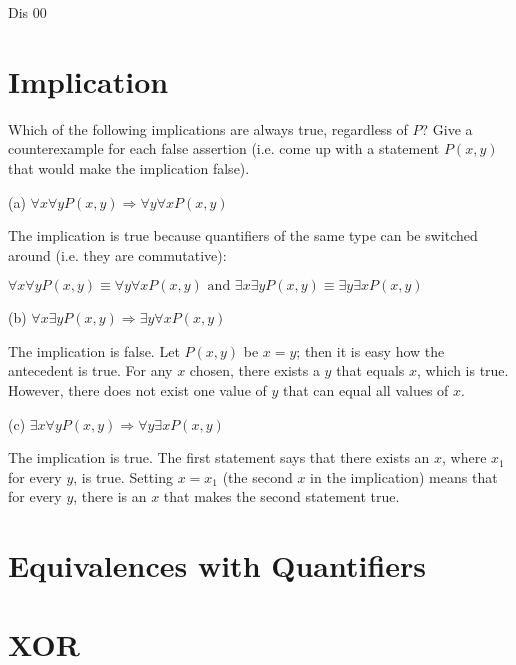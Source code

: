 \documentclass[12pt,a4paper]{article}
\begin{document}
\raggedright

\begin{center}
\huge{Dis 00}
\end{center}

\section{Implication}

Which of the following implications are always true, regardless of $P$? Give a counterexample for each false assertion (i.e. come up with a statement $P(x,y)$ that would make the implication false).

\bigbreak

(a) $\forall x\forall yP(x,y)\Rightarrow\forall y\forall xP(x,y)$

\bigbreak

\color{red}
The implication is true because quantifiers of the same type can be switched around (i.e. they are commutative): 

\begin{center}
$\forall x\forall yP(x,y)\equiv \forall y\forall xP(x,y) \text{ and } \exists x\exists yP(x,y)\equiv \exists y\exists xP(x,y)$
\end{center}

\bigbreak

\color{black}
(b) $\forall x\exists yP(x,y) \Rightarrow \exists y\forall xP(x,y)$

\bigbreak

\color{red}
The implication is false. Let $P(x,y)$ be $x=y$; then it is easy how the antecedent is true. For any $x$ chosen, there exists a $y$ that equals $x$, which is true. However, there does not exist one value of $y$ that can equal all values of $x$.

\bigbreak

\color{black}
(c) $\exists x\forall yP(x,y)\Rightarrow\forall y\exists xP(x,y)$

\bigbreak

\color{red}
The implication is true. The first statement says that there exists an $x$, where $x_1$ for every $y$, is true. Setting $x=x_1$ (the second $x$ in the implication) means that for every $y$, there is an $x$ that makes the second statement true.

\color{black}
\section{Equivalences with Quantifiers}

\section{XOR}
\end{document}
